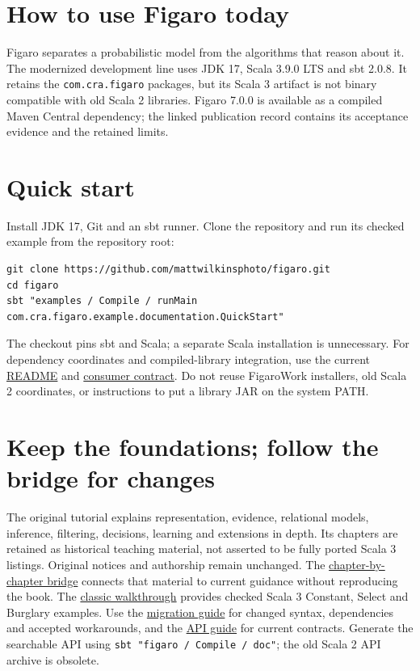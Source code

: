 \section*{How to use Figaro today}
Figaro separates a probabilistic model from the algorithms that reason about it.
The modernized development line uses JDK 17, Scala 3.9.0 LTS and sbt 2.0.8.
It retains the \texttt{com.cra.figaro} packages, but its Scala 3 artifact is not
binary compatible with old Scala 2 libraries. Figaro 7.0.0 is available as a
compiled Maven Central dependency; the linked publication record contains its
acceptance evidence and the retained limits.

\section*{Quick start}
Install JDK 17, Git and an sbt runner. Clone the repository and run its checked
example from the repository root:
\begingroup\scriptsize
\begin{verbatim}
git clone https://github.com/mattwilkinsphoto/figaro.git
cd figaro
sbt "examples / Compile / runMain com.cra.figaro.example.documentation.QuickStart"
\end{verbatim}
\endgroup
The checkout pins sbt and Scala; a separate Scala installation is unnecessary.
For dependency coordinates and compiled-library integration, use the current
\href{https://github.com/mattwilkinsphoto/figaro/blob/main/README.md}{README}
and \href{https://github.com/mattwilkinsphoto/figaro/blob/main/CONSUMER_BOUNDARY.md}{consumer contract}.
Do not reuse FigaroWork installers, old Scala 2 coordinates, or instructions to
put a library JAR on the system PATH.

\section*{Keep the foundations; follow the bridge for changes}
The original tutorial explains representation, evidence, relational models,
inference, filtering, decisions, learning and extensions in depth. Its chapters
are retained as historical teaching material, not asserted to be fully ported
Scala 3 listings. Original notices and authorship remain unchanged.
The \href{https://github.com/mattwilkinsphoto/figaro/blob/main/docs/DOCUMENTATION_MIGRATION.md}{chapter-by-chapter bridge}
connects that material to current guidance without reproducing the book.
The \href{https://github.com/mattwilkinsphoto/figaro/blob/main/docs/TUTORIAL.md}{classic walkthrough}
provides checked Scala 3 Constant, Select and Burglary examples.
Use the \href{https://github.com/mattwilkinsphoto/figaro/blob/main/docs/MIGRATION.md}{migration guide}
for changed syntax, dependencies and accepted workarounds, and the
\href{https://github.com/mattwilkinsphoto/figaro/blob/main/docs/API_GUIDE.md}{API guide}
for current contracts. Generate the searchable API using
\texttt{sbt "figaro / Compile / doc"}; the old Scala 2 API archive is obsolete.

